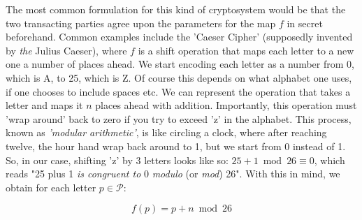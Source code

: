 \documentclass[11pt,a4paper]{article}
\begin{document}
The most common formulation for this kind of cryptosystem would be that the two transacting parties agree upon the parameters for the map $f$ in secret beforehand. Common examples include the 'Caeser Cipher' (supposedly invented by \textit{the} Julius Caeser), where $f$ is a shift operation that maps each letter to a new one a number of places ahead. We start encoding each letter as a number from 0, which is A, to 25, which is Z. Of course this depends on what alphabet one uses, if one chooses to include spaces etc. We can represent the operation that takes a letter and maps it $n$ places ahead with addition. Importantly, this operation must 'wrap around' back to zero if you try to exceed 'z' in the alphabet. This process, known as \textit{'modular arithmetic'}, is like circling a clock, where after reaching twelve, the hour hand wrap back around to 1, but we start from 0 instead of 1. So, in our case, shifting 'z' by 3 letters looks like so: $25 + 1 \bmod 26 \equiv 0$, which reads "25 plus 1 \textit{is congruent to} 0 \textit{modulo} (or \textit{mod}) 26". With this in mind, we obtain for each letter $p \in \mathcal{P}$:

\[
f(p) = p + n \bmod 26
\]

\end{document}
